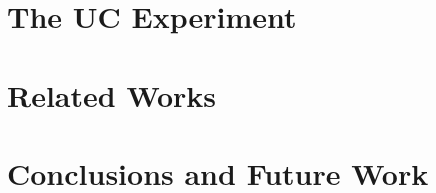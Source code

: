 \documentclass[acmsmall,screen,review,anonymous]{acmart}
\begin{document}
\section{The UC Experiment} \label{sec:execuc}


%

%
%


\section{Related Works} \label{sec:related}


\section{Conclusions and Future Work}





\newpage




% 

% 
\end{document}
